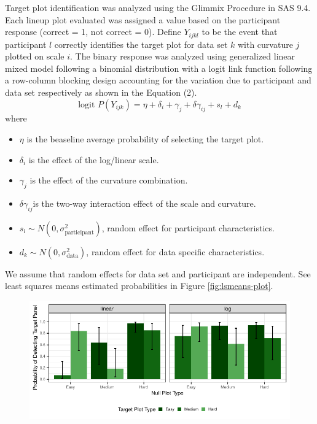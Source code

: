 \begin{appendix}
Target plot identification was analyzed using the Glimmix Procedure in
SAS 9.4. Each lineup plot evaluated was assigned a value based on the
participant response (correct = 1, not correct = 0). Define \(Y_{ijkl}\)
to be the event that participant \(l\) correctly identifies the target
plot for data set \(k\) with curvature \(j\) plotted on scale \(i\). The
binary response was analyzed using generalized linear mixed model
following a binomial distribution with a logit link function following a
row-column blocking design accounting for the variation due to
participant and data set respectively as shown in the Equation (2).
\begin{equation}
\text{logit }P(Y_{ijk}) = \eta + \delta_i + \gamma_j + \delta \gamma_{ij} + s_l + d_k
\end{equation} where

\begin{itemize}
\item $\eta$ is the beaseline average probability of selecting the target plot. 
\item $\delta_i$ is the effect of the log/linear scale.
\item $\gamma_j$ is the effect of the curvature combination.
\item $\delta\gamma_{ij}$is the two-way interaction effect of the scale and curvature.
\item $s_l \sim N(0,\sigma^2_\text{participant})$, random effect for participant characteristics.
\item $d_k \sim N(0,\sigma^2_{\text{data}})$, random effect for data specific characteristics. 
\end{itemize}

We assume that random effects for data set and participant are
independent. See least squares means estimated probabilities in Figure
\ref{fig:lsmeans-plot}.

\begin{figure}

{\centering \includegraphics[width=\columnwidth]{./images/lsmeans-plot-1} 

}
\end{figure}
\end{appendix}
